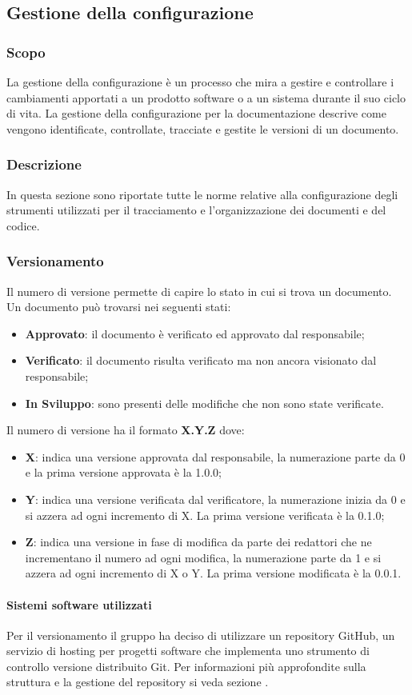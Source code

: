 \subsection{Gestione della configurazione}
\subsubsection{Scopo}
La gestione della configurazione è un processo che mira a gestire e controllare i cambiamenti apportati a un prodotto software o a un sistema durante il suo ciclo di vita. 
La gestione della configurazione per la documentazione descrive come vengono identificate, controllate, tracciate e gestite le versioni di un documento.
\subsubsection{Descrizione}
In questa sezione sono riportate tutte le norme relative alla configurazione degli strumenti utilizzati per il tracciamento e l’organizzazione dei documenti e del codice.
\subsubsection{Versionamento}
Il numero di versione permette di capire lo stato in cui si trova un documento.
Un documento può trovarsi nei seguenti stati:
\begin{itemize} 
    \item \textbf{Approvato}: il documento è verificato ed approvato dal responsabile;
    \item \textbf{Verificato}: il documento risulta verificato ma non ancora visionato dal responsabile;
    \item \textbf{In Sviluppo}: sono presenti delle modifiche che non sono state verificate.
\end{itemize}
Il numero di versione ha il formato \textbf{X.Y.Z} dove:
\begin{itemize} 
    \item \textbf{X}: indica una versione approvata dal responsabile, la numerazione parte da 0
    e la prima versione approvata è la 1.0.0;
    \item \textbf{Y}: indica una versione verificata dal verificatore, la numerazione inizia da 0 e si azzera ad ogni incremento di X. La prima versione
    verificata è la 0.1.0;
    \item \textbf{Z}: indica una versione in fase di modifica da parte dei redattori che ne incrementano il numero ad ogni modifica,
    la numerazione parte da 1 e si azzera ad ogni incremento di X o Y. La prima versione modificata è la 0.0.1.
\end{itemize}

\paragraph{Sistemi software utilizzati}
Per il versionamento il gruppo ha deciso di utilizzare un repository GitHub, un servizio di hosting per progetti software che implementa uno strumento di controllo versione distribuito Git.
Per informazioni più approfondite sulla struttura e la gestione del repository si veda sezione .